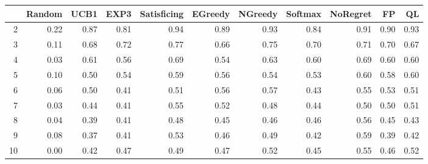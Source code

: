 \begin{table}[ht]
\centering
\begin{tabular}{rrrrrrrrrrr}
  \hline
 & Random & UCB1 & EXP3 & Satisficing & EGreedy & NGreedy & Softmax & NoRegret & FP & QL \\ 
  \hline
2 & 0.22 & 0.87 & 0.81 & 0.94 & 0.89 & 0.93 & 0.84 & 0.91 & 0.90 & 0.93 \\ 
  3 & 0.11 & 0.68 & 0.72 & 0.77 & 0.66 & 0.75 & 0.70 & 0.71 & 0.70 & 0.67 \\ 
  4 & 0.03 & 0.61 & 0.56 & 0.69 & 0.54 & 0.63 & 0.60 & 0.69 & 0.60 & 0.60 \\ 
  5 & 0.10 & 0.50 & 0.54 & 0.59 & 0.56 & 0.54 & 0.53 & 0.60 & 0.58 & 0.60 \\ 
  6 & 0.06 & 0.50 & 0.41 & 0.51 & 0.56 & 0.57 & 0.43 & 0.55 & 0.53 & 0.51 \\ 
  7 & 0.03 & 0.44 & 0.41 & 0.55 & 0.52 & 0.48 & 0.44 & 0.50 & 0.50 & 0.51 \\ 
  8 & 0.04 & 0.39 & 0.41 & 0.48 & 0.45 & 0.46 & 0.46 & 0.56 & 0.45 & 0.43 \\ 
  9 & 0.08 & 0.37 & 0.41 & 0.53 & 0.46 & 0.49 & 0.42 & 0.59 & 0.39 & 0.42 \\ 
  10 & 0.00 & 0.42 & 0.47 & 0.49 & 0.47 & 0.52 & 0.45 & 0.55 & 0.46 & 0.52 \\ 
   \hline
\end{tabular}
\end{table}
